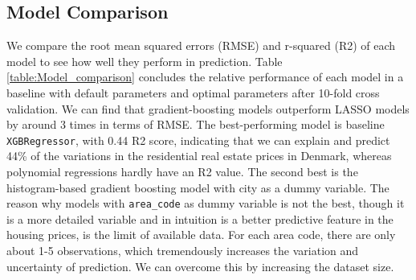 \documentclass[12pt]{article} %
\begin{document}
{        \subsection{Model Comparison}
            We compare the root mean squared errors (RMSE) and r-squared (R2) of each model to see how well they perform in prediction. Table \ref{table:Model_comparison} concludes the relative performance of each model in a baseline with default parameters and optimal parameters after 10-fold cross validation. We can find that gradient-boosting models outperform LASSO models by around 3 times in terms of RMSE. The best-performing model is baseline \texttt{XGBRegressor}, with 0.44 R2 score, indicating that we can explain and predict 44\% of the variations in the residential real estate prices in Denmark, whereas polynomial regressions hardly have an R2 value. The second best is the histogram-based gradient boosting model with city as a dummy variable. The reason why models with \texttt{area\_code} as dummy variable is not the best, though it is a more detailed variable and in intuition is a better predictive feature in the housing prices, is the limit of available data. For each area code, there are only about 1-5 observations, which tremendously increases the variation and uncertainty of prediction. We can overcome this by increasing the dataset size.

}
\end{document}
